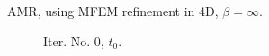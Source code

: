\documentclass[a4paper,12pt]{amsart}
\numberwithin{equation}{section}
\begin{document}
\begin{figure}[h!]
\caption{AMR, using MFEM refinement in 4D, $\beta = \infty$.}
\label{fig:amr_trans4D_paraview_mars_longrun_part1}
\end{figure}

\begin{figure}[h!]
\centering
\begin{subfigure}[t]{0.23\textwidth}
    \caption{Iter. No. 0, $t_0$.}
\end{subfigure}
	\hfill
\begin{subfigure}[t]{0.23\textwidth}

\end{subfigure}
\end{figure}
\end{document}
